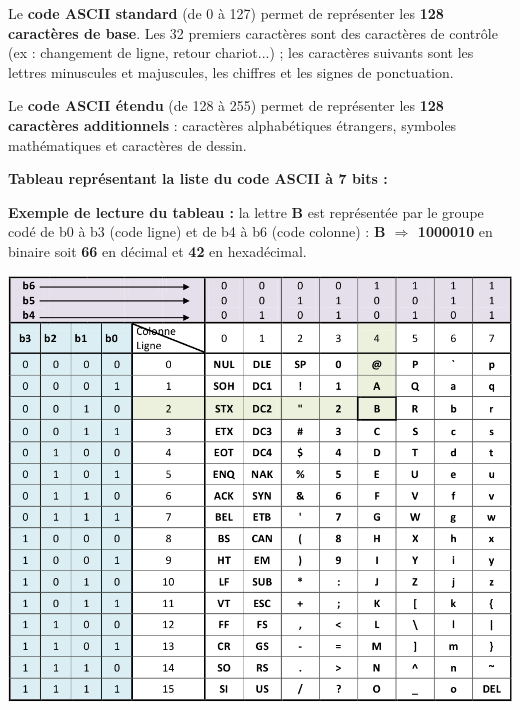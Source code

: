 \documentclass{article}
\begin{document}
Le \textbf{code ASCII standard} (de 0 à 127) permet de représenter les \textbf{128 caractères de base}. 
Les 32 premiers caractères sont des caractères de contrôle (ex : changement de ligne, retour chariot...) ;
les caractères suivants sont les lettres minuscules et majuscules, les chiffres et les signes de ponctuation.

Le \textbf{code ASCII étendu} (de 128 à 255) permet de représenter les \textbf{128 caractères additionnels} : caractères alphabétiques
étrangers, symboles mathématiques et caractères de dessin.

\textbf{Tableau représentant la liste du code ASCII à 7 bits :}

\textbf{Exemple de lecture du tableau :} la lettre \textbf{B} est représentée par le groupe codé de b0 à b3 (code ligne) et de b4 à b6
(code colonne) : \textbf{B $\Rightarrow$ \color{red}1000010} en binaire soit \textbf{\color{red}66} en décimal et \textbf{\color{red}42} en hexadécimal.

\begin{center}
	\includegraphics[scale=.6]{./figures/ascii1.png}
\end{center}
\end{document}
